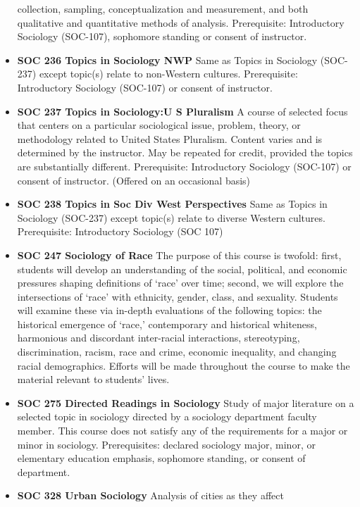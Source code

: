 \documentclass[
  letterpaper,
]{scrbook}
\begin{document}
\begin{itemize}
  collection, sampling, conceptualization and measurement, and both
  qualitative and quantitative methods of analysis. Prerequisite:
  Introductory Sociology (SOC-107), sophomore standing or consent of
  instructor.\\
\item
  \textbf{SOC 236 Topics in Sociology NWP} Same as Topics in Sociology
  (SOC-237) except topic(s) relate to non-Western cultures.
  Prerequisite: Introductory Sociology (SOC-107) or consent of
  instructor.
\item
  \textbf{SOC 237 Topics in Sociology:U S Pluralism} A course of
  selected focus that centers on a particular sociological issue,
  problem, theory, or methodology related to United States Pluralism.
  Content varies and is determined by the instructor. May be repeated
  for credit, provided the topics are substantially different.
  Prerequisite: Introductory Sociology (SOC-107) or consent of
  instructor. (Offered on an occasional basis)\\
\item
  \textbf{SOC 238 Topics in Soc Div West Perspectives} Same as Topics in
  Sociology (SOC-237) except topic(s) relate to diverse Western
  cultures. Prerequisite: Introductory Sociology (SOC 107)
\item
  \textbf{SOC 247 Sociology of Race} The purpose of this course is
  twofold: first, students will develop an understanding of the social,
  political, and economic pressures shaping definitions of `race' over
  time; second, we will explore the intersections of `race' with
  ethnicity, gender, class, and sexuality. Students will examine these
  via in-depth evaluations of the following topics: the historical
  emergence of `race,' contemporary and historical whiteness, harmonious
  and discordant inter-racial interactions, stereotyping,
  discrimination, racism, race and crime, economic inequality, and
  changing racial demographics. Efforts will be made throughout the
  course to make the material relevant to students' lives.
\item
  \textbf{SOC 275 Directed Readings in Sociology} Study of major
  literature on a selected topic in sociology directed by a sociology
  department faculty member. This course does not satisfy any of the
  requirements for a major or minor in sociology. Prerequisites:
  declared sociology major, minor, or elementary education emphasis,
  sophomore standing, or consent of department.\\
\item
  \textbf{SOC 328 Urban Sociology} Analysis of cities as they affect

\end{itemize}
\end{document}
